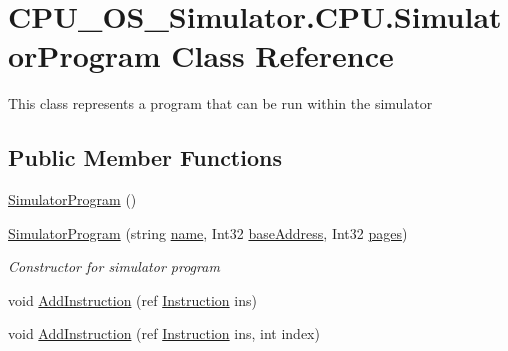 \hypertarget{class_c_p_u___o_s___simulator_1_1_c_p_u_1_1_simulator_program}{}\section{C\+P\+U\+\_\+\+O\+S\+\_\+\+Simulator.\+C\+P\+U.\+Simulator\+Program Class Reference}
\label{class_c_p_u___o_s___simulator_1_1_c_p_u_1_1_simulator_program}


This class represents a program that can be run within the simulator  


\subsection*{Public Member Functions}
\begin{DoxyCompactItemize}
\item 
\hyperlink{class_c_p_u___o_s___simulator_1_1_c_p_u_1_1_simulator_program_a92873858cd0a0d7e506f5718788a9e5e}{Simulator\+Program} ()
\item 
\hyperlink{class_c_p_u___o_s___simulator_1_1_c_p_u_1_1_simulator_program_af30bc76187c64b374a48d6d7f9e94d54}{Simulator\+Program} (string \hyperlink{class_c_p_u___o_s___simulator_1_1_c_p_u_1_1_simulator_program_ad4797b5d81ceb01cd4207a97b7af36c5}{name}, Int32 \hyperlink{class_c_p_u___o_s___simulator_1_1_c_p_u_1_1_simulator_program_aaea4fb02fb8d22806ce58b957f9b573d}{base\+Address}, Int32 \hyperlink{class_c_p_u___o_s___simulator_1_1_c_p_u_1_1_simulator_program_ac4d19d17c7ee206ad6343884f3390054}{pages})
\begin{DoxyCompactList}\small\item\em Constructor for simulator program \end{DoxyCompactList}\item 
void \hyperlink{class_c_p_u___o_s___simulator_1_1_c_p_u_1_1_simulator_program_a6b6df3400e406b1dc6de3787f1a8fc61}{Add\+Instruction} (ref \hyperlink{class_c_p_u___o_s___simulator_1_1_c_p_u_1_1_instruction}{Instruction} ins)
\item 
void \hyperlink{class_c_p_u___o_s___simulator_1_1_c_p_u_1_1_simulator_program_a1142bf081f4173d0276504db3d232968}{Add\+Instruction} (ref \hyperlink{class_c_p_u___o_s___simulator_1_1_c_p_u_1_1_instruction}{Instruction} ins, int index)
\end{DoxyCompactItemize}
